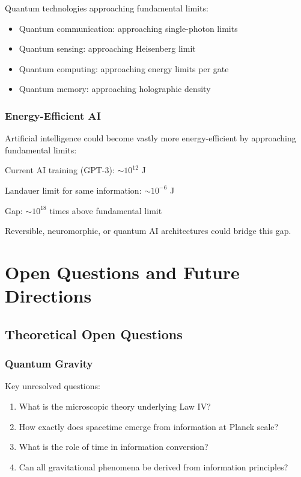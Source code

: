 \documentclass[11pt,a4paper]{article}
\theoremstyle{plain}
\theoremstyle{definition}
\theoremstyle{remark}
\begin{document}
Quantum technologies approaching fundamental limits:

\begin{itemize}[leftmargin=*]
\item Quantum communication: approaching single-photon limits
\item Quantum sensing: approaching Heisenberg limit
\item Quantum computing: approaching energy limits per gate
\item Quantum memory: approaching holographic density
\end{itemize}

\subsubsection{Energy-Efficient AI}

Artificial intelligence could become vastly more energy-efficient by approaching fundamental limits:

Current AI training (GPT-3): $\sim 10^{12}$ J

Landauer limit for same information: $\sim 10^{-6}$ J

Gap: $\sim 10^{18}$ times above fundamental limit

Reversible, neuromorphic, or quantum AI architectures could bridge this gap.

\section{Open Questions and Future Directions}
\label{sec:conclusions}

\subsection{Theoretical Open Questions}

\subsubsection{Quantum Gravity}

Key unresolved questions:

\begin{enumerate}[leftmargin=*]
\item What is the microscopic theory underlying Law IV?
\item How exactly does spacetime emerge from information at Planck scale?
\item What is the role of time in information conversion?
\item Can all gravitational phenomena be derived from information principles?
\end{enumerate}
\end{document}
